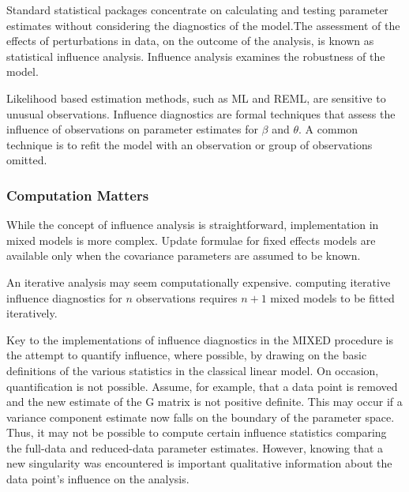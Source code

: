 \documentclass[12pt, a4paper]{report}
\theoremstyle{plain}
\theoremstyle{definition}
\theoremstyle{remark}
\begin{document}
	Standard statistical packages concentrate on calculating and testing parameter estimates without considering the diagnostics of the model.The assessment of the effects of perturbations in data, on the outcome of the analysis, is known as statistical influence analysis. Influence analysis examines the robustness of the model.
	

	
	
	
	Likelihood based estimation methods, such as ML and REML, are sensitive to unusual observations. Influence diagnostics are formal techniques that assess the influence of observations on parameter estimates for $\beta$ and $\theta$. A common technique is to refit the model with an observation or group of observations omitted.
	
	
	
	
	
	\subsubsection{Computation Matters}
	While the concept of influence analysis is straightforward, implementation in mixed models is more complex. Update formulae for fixed effects models are available only when the covariance parameters are assumed to be known.
	
	
	An iterative analysis may seem computationally expensive. computing iterative influence diagnostics for $n$ observations
	requires $n+1$ mixed models to be fitted iteratively.
	
	
Key to the implementations of influence diagnostics in the MIXED procedure is the attempt to quantify
influence, where possible, by drawing on the basic definitions of the various statistics in the classical linear
model. On occasion, quantification is not possible. Assume, for example, that a data point is removed
and the new estimate of the G matrix is not positive definite. This may occur if a variance component
estimate now falls on the boundary of the parameter space. Thus, it may not be possible to compute certain
influence statistics comparing the full-data and reduced-data parameter estimates. However, knowing that
a new singularity was encountered is important qualitative information about the data point’s influence on
the analysis.
	
\end{document}
